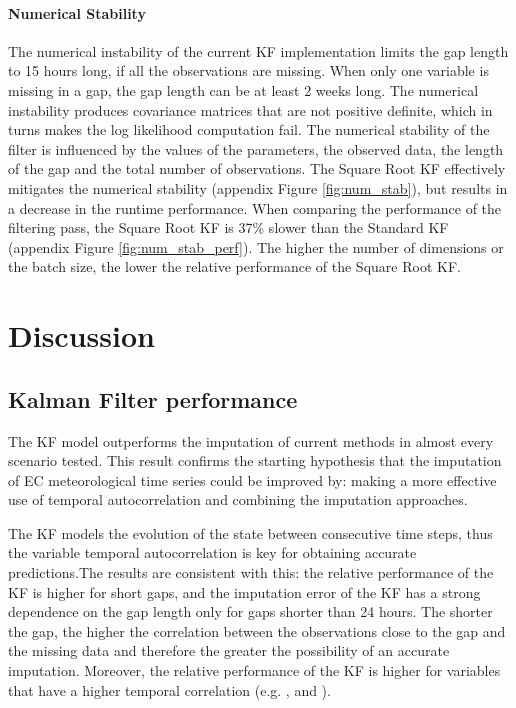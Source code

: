 \documentclass{article}
\let\Oldsection\section
\renewcommand{\section}{\FloatBarrier\Oldsection}
\let\Oldsubsection\subsection
\renewcommand{\subsection}{\FloatBarrier\Oldsubsection}
\begin{document}
\paragraph{Numerical Stability} The numerical instability of the current KF implementation limits the gap length to 15 hours long, if all the observations are missing. When only one variable is missing in a gap, the gap length can be at least 2 weeks long.
The numerical instability produces covariance matrices that are not positive definite, which in turns makes the log likelihood computation fail. The numerical stability of the filter is influenced by the values of the parameters, the observed data, the length of the gap and the total number of observations.
The Square Root KF effectively mitigates the numerical stability (appendix Figure \ref{fig:num_stab}), but results in a decrease in the runtime performance. When comparing the performance of the filtering pass, the Square Root KF is 37\% slower than the Standard KF (appendix Figure \ref{fig:num_stab_perf}). The higher the number of dimensions or the batch size, the lower the relative performance of the Square Root KF.

\section{Discussion}

\subsection{Kalman Filter performance}

The KF model outperforms the imputation of current methods in almost every scenario tested. This result confirms the starting hypothesis that the imputation of EC meteorological time series could be improved by: making a more effective use of temporal autocorrelation and combining the imputation approaches.

The KF models the evolution of the state between consecutive time steps, thus the variable temporal autocorrelation is key for obtaining accurate predictions.The results are consistent with this: the relative performance of the KF is higher for short gaps, and the imputation error of the KF has a strong dependence on the gap length only for gaps shorter than 24 hours.  The shorter the gap, the higher the correlation between the observations close to the gap and the missing data and therefore the greater the possibility of an accurate imputation. Moreover, the relative performance of the KF is higher for variables that have a higher temporal correlation (e.g. ,  and ).
\end{document}
